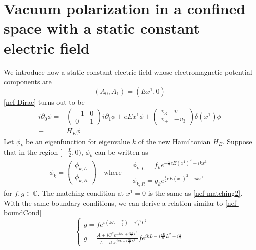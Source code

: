 \section{Vacuum polarization in a confined space with a static constant electric field}\label{vacuum-sect-field}
We introduce now a static constant electric field whose electromagnetic potential components are 
\begin{equation*}
(A_0, A_1) = (E x^1, 0)
\end{equation*}
\cref{nef-Dirac} turns out to be
\begin{equation*} 
\begin{split}
i \partial_0 \phi = &
\begin{pmatrix} 
-1 & 0 \\
0 & 1 
\end{pmatrix} i \partial_1 \phi + eEx^1 \phi +
\begin{pmatrix}
v_3 & v_- \\
v_+ & -v_3
\end{pmatrix} \delta(x^1) \phi \\
\equiv & H_E \phi
\end{split}
\end{equation*}
Let $\phi_k$ be an eigenfunction for eigenvalue $k$ of the new Hamiltonian $H_E$. 
Suppose that in the region $[-\frac{L}{2}, 0)$, 
$\phi_k$ can be written as 
\begin{equation}
\phi_k =\begin{pmatrix}
\phi_{k,L}  \\
\phi_{k,R}
\end{pmatrix} 
\quad \textrm{where $\begin{split} 
 & \phi_{k,L} = f_k e^{-\frac{i}{2}eE(x^1)^2 + ikx^1} \\
& \phi_{k,R} = g_k e^{\frac{i}{2}eE(x^1)^2 - ikx^1}
\end{split}
$}
\end{equation}
for $f, g\in \mathbb{C}$. 
The matching condition at $x^1 = 0$ is the same as \cref{nef-matching2}. 
With the same boundary conditions, we can derive a relation similar to \cref{nef-boundCond}
\begin{equation}
\begin{cases}
g = fe^{i(kL + \frac{\pi}{2}) - i\frac{eE}{8}L^2}  \\
g = \frac{A + iC^* e^{-ikL + i\frac{eE}{8}L^2 }}{A - iC e^{ikL - i\frac{eE}{8}L^2}} fe^{ikL - i\frac{eE}{8}L^2 + i\frac{\pi}{2}}
\end{cases}
\end{equation}
